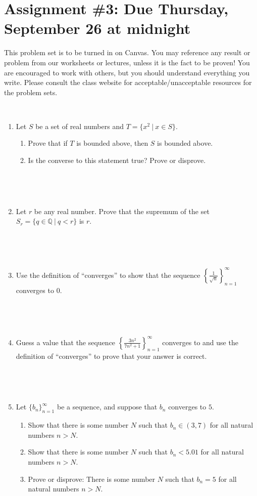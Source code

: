 \documentclass[12pt]{amsart}
\newcommand{\Q}{\mathbb{Q}}
\newcommand{\showsol}[1]{\def\displaysol{#1}}
\begin{document}
\showsol{1}
	
	\thispagestyle{empty}
	
	\section*{Assignment \#3: Due Thursday, September 26 at midnight}
	
	This problem set is to be turned in on Canvas. You may reference any result or problem from our worksheets or lectures, unless it is the fact to be proven! You are encouraged to work with others, but you should understand everything you write. Please consult the class website for acceptable/unacceptable resources for the problem sets.
	
	\
	
	



\begin{enumerate}

\item Let $S$ be a set of real numbers and $T=\{x^2 \ | \ x\in S\}$.
\begin{enumerate}
\item Prove that if $T$ is bounded above, then $S$ is bounded above.
\item Is the converse to this statement true? Prove or disprove.
\end{enumerate}

\

\


\item Let $r$ be any real number. Prove that the supremum of the set $S_r = \{ q \in \Q \ | \ q<r\}$ is $r$.

\

\

\item Use the definition of ``converges'' to show that the sequence $\displaystyle \left\{ \frac{1}{\sqrt{n}} \right\}_{n=1}^\infty$ converges to $0$.

\

\

\item Guess a value that the sequence $\displaystyle \left\{\frac{3n^2}{7n^2+1} \right\}_{n=1}^\infty$ converges to and use the definition of ``converges'' to prove that your answer is correct.

\

\

\item Let $\{b_n\}_{n=1}^\infty$ be a sequence, and suppose that $b_n$ converges to $5$.
\begin{enumerate}
\item Show that there is some number $N$ such that $b_n\in (3,7)$ for all natural numbers $n>N$.
\item Show that there is some number $N$ such that $b_n<5.01$ for all natural numbers $n>N$.
\item Prove or disprove: There is some number $N$ such that $b_n=5$ for all natural numbers $n>N$.
\end{enumerate}





\end{enumerate}
\end{document}
